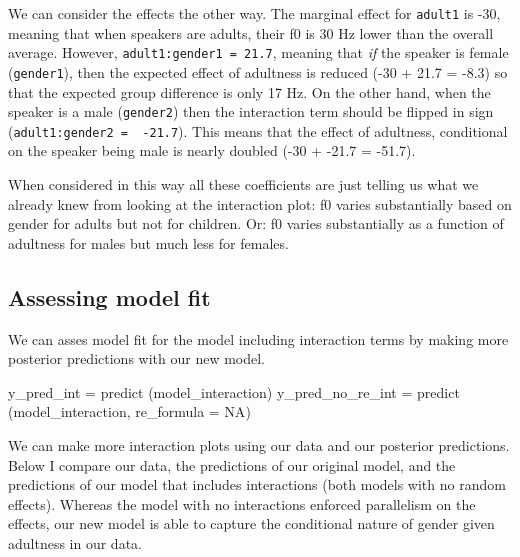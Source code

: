 \documentclass[
]{book}
\newenvironment{Shaded}{\begin{snugshade}}{\end{snugshade}}
\newcommand{\AttributeTok}[1]{\textcolor[rgb]{0.77,0.63,0.00}{#1}}
\newcommand{\ConstantTok}[1]{\textcolor[rgb]{0.00,0.00,0.00}{#1}}
\newcommand{\FunctionTok}[1]{\textcolor[rgb]{0.00,0.00,0.00}{#1}}
\newcommand{\NormalTok}[1]{#1}
\newcommand{\OtherTok}[1]{\textcolor[rgb]{0.56,0.35,0.01}{#1}}
\begin{document}
We can consider the effects the other way. The marginal effect for \texttt{adult1} is -30, meaning that when speakers are adults, their f0 is 30 Hz lower than the overall average. However, \texttt{adult1:gender1\ =\ 21.7}, meaning that \emph{if} the speaker is female (\texttt{gender1}), then the expected effect of adultness is reduced (-30 + 21.7 = -8.3) so that the expected group difference is only 17 Hz. On the other hand, when the speaker is a male (\texttt{gender2}) then the interaction term should be flipped in sign (\texttt{adult1:gender2\ =\ \ -21.7}). This means that the effect of adultness, conditional on the speaker being male is nearly doubled (-30 + -21.7 = -51.7).

When considered in this way all these coefficients are just telling us what we already knew from looking at the interaction plot: f0 varies substantially based on gender for adults but not for children. Or: f0 varies substantially as a function of adultness for males but much less for females.

\hypertarget{assessing-model-fit}{%
\subsection{Assessing model fit}\label{assessing-model-fit}}

We can asses model fit for the model including interaction terms by making more posterior predictions with our new model.

\begin{Shaded}
\begin{Highlighting}[]
\NormalTok{y\_pred\_int }\OtherTok{=} \FunctionTok{predict}\NormalTok{ (model\_interaction)}
\NormalTok{y\_pred\_no\_re\_int }\OtherTok{=} \FunctionTok{predict}\NormalTok{ (model\_interaction, }\AttributeTok{re\_formula =} \ConstantTok{NA}\NormalTok{)}
\end{Highlighting}
\end{Shaded}

We can make more interaction plots using our data and our posterior predictions. Below I compare our data, the predictions of our original model, and the predictions of our model that includes interactions (both models with no random effects). Whereas the model with no interactions enforced parallelism on the effects, our new model is able to capture the conditional nature of gender given adultness in our data.
\end{document}
